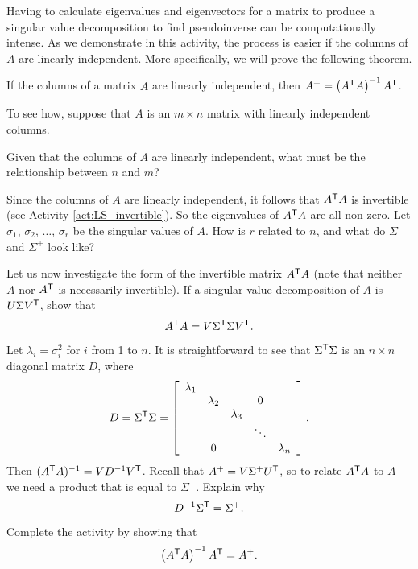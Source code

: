 \begin{activity} \label{act:7_b_lin_indep_cols} Having to calculate eigenvalues and eigenvectors for a matrix to produce a singular value decomposition to find pseudoinverse can be computationally intense. As we demonstrate in this activity, the process is easier if the columns of $A$ are linearly independent. More specifically, we will prove the following theorem.

\begin{theorem} \label{thm:7_d_SVD_cols_lin_indep} If the columns of a matrix $A$ are linearly independent, then $A^{+} = \left(A^{\mathsf{T}}A\right)^{-1}A^{\mathsf{T}}$.
\end{theorem}

To see how, suppose that $A$ is an $m \times n$ matrix with linearly independent columns. 
	\ba
	\item Given that the columns of $A$ are linearly independent, what must be the relationship between $n$ and $m$?

	\item Since the columns of $A$ are linearly independent, it follows that $A^{\mathsf{T}}A$ is invertible (see Activity \ref{act:LS_invertible}). So the eigenvalues of $A^{\mathsf{T}}A$ are all non-zero. Let $\sigma_1$, $\sigma_2$, $\ldots$, $\sigma_r$ be the singular values of $A$.  How is $r$ related to $n$, and what do $\Sigma$ and $\Sigma^{+}$ look like? 


	\item Let us now investigate the form of the invertible matrix $A^{\mathsf{T}}A$ (note that neither $A$ nor $A^{\mathsf{T}}$ is necessarily invertible). If a singular value decomposition of $A$ is $U \Sigma V^{\mathsf{T}}$, show that 
\[A^{\mathsf{T}}A = V \Sigma^{\mathsf{T}} \Sigma V^{\mathsf{T}}.\]

	\item Let $\lambda_i = \sigma_i^2$ for $i$ from 1 to $n$. It is straightforward to see that $\Sigma^{\mathsf{T}} \Sigma$ is an $n \times n$ diagonal matrix $D$, where
\[D = \Sigma^{\mathsf{T}} \Sigma = \left[ \begin{array}{ccccc} \lambda_1&&&& \\ & \lambda_2&&0& \\ && \lambda_3&& \\ &  & & \ddots &   \\ &0&&& \lambda_n \end{array} \right] .\]
Then $(A^{\mathsf{T}}A)^{-1} = VD^{-1}V^{\mathsf{T}}$. Recall that $A^{+} = V \Sigma^{+} U^{\mathsf{T}}$, so to relate $A^{\mathsf{T}}A$ to $A^{+}$ we need a product that is equal to $\Sigma^{+}$. Explain why 
\[D^{-1} \Sigma^{\mathsf{T}} = \Sigma^{+}.\]

	\item Complete the activity by showing that 
\[\left(A^{\mathsf{T}}A\right)^{-1} A^{\mathsf{T}} = A^{+}.\] 

	\ea
\end{activity}

